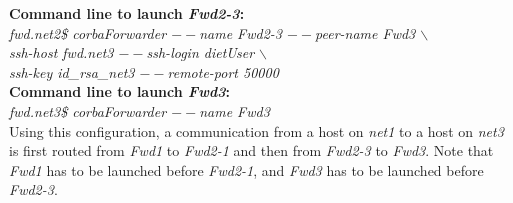 \documentclass{report}
\begin{document}
\noindent\textbf{Command line to launch \textit{Fwd2-3}: }\\
{\small \it fwd.net2\$ corbaForwarder {\tiny$--$}name Fwd2-3
  {\tiny$--$}peer-name Fwd3 $\backslash$\\
  \hspace*{4.2cm}{\tiny$--$}ssh-host fwd.net3 {\tiny$--$}ssh-login
  dietUser $\backslash$\\
  \hspace*{4.2cm}{\tiny$--$}ssh-key id\_rsa\_net3
  {\tiny$--$}remote-port 50000}\\[2mm]

\noindent\textbf{Command line to launch \textit{Fwd3}: }\\
{\small \it fwd.net3\$ corbaForwarder {\tiny$--$}name Fwd3}\\[3mm]

Using this configuration, a communication from a host on \textit{net1}
to a host on \textit{net3} is first routed from \textit{Fwd1} to
\textit{Fwd2-1} and then from \textit{Fwd2-3} to \textit{Fwd3}.
Note that \textit{Fwd1} has to be launched before \textit{Fwd2-1}, and
\textit{Fwd3} has to be launched before \textit{Fwd2-3}.
\end{document}
